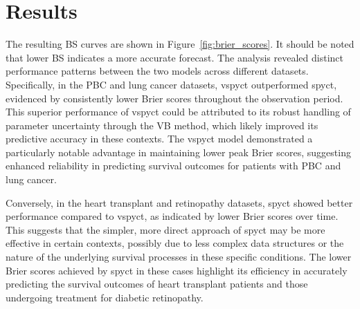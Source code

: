 \documentclass[3p,review,authoryear]{elsarticle}
\begin{document}
\section{Results}

The resulting BS curves are shown in Figure~\ref{fig:brier_scores}.
It should be noted that lower BS indicates a more accurate forecast.
The analysis revealed distinct performance patterns between the two models across different datasets.
Specifically, in the PBC and lung cancer datasets, \gls{vspyct} outperformed \gls{spyct}, evidenced by consistently lower Brier scores throughout the observation period.
This superior performance of \gls{vspyct} could be attributed to its robust handling of parameter uncertainty through the VB method, which likely improved its predictive accuracy in these contexts.
The \gls{vspyct} model demonstrated a particularly notable advantage in maintaining lower peak Brier scores, suggesting enhanced reliability in predicting survival outcomes for patients with PBC and lung cancer.

Conversely, in the heart transplant and retinopathy datasets, \gls{spyct} showed better performance compared to \gls{vspyct}, as indicated by lower Brier scores over time.
This suggests that the simpler, more direct approach of \gls{spyct} may be more effective in certain contexts, possibly due to less complex data structures or the nature of the underlying survival processes in these specific conditions.
The lower Brier scores achieved by \gls{spyct} in these cases highlight its efficiency in accurately predicting the survival outcomes of heart transplant patients and those undergoing treatment for diabetic retinopathy.

\end{document}
